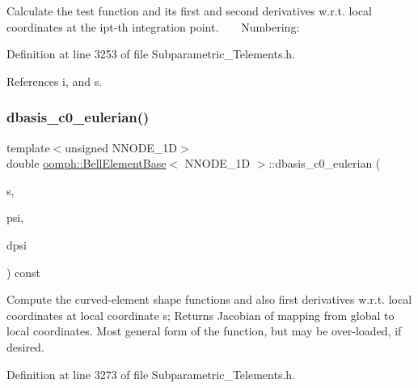 Calculate the test function and its first and second derivatives w.\+r.\+t. local coordinates at the ipt-\/th integration point. ~\newline
~\newline
 Numbering\+: 

Definition at line 3253 of file Subparametric\+\_\+\+Telements.\+h.



References i, and s.

\mbox{\label{classoomph_1_1BellElementBase_a27559cf4dd3cb50a84dfe40378c9c453}} 
\subsubsection{\texorpdfstring{dbasis\+\_\+c0\+\_\+eulerian()}{dbasis\_c0\_eulerian()}}
{\footnotesize\ttfamily template$<$unsigned N\+N\+O\+D\+E\+\_\+1D$>$ \\
double \hyperlink{classoomph_1_1BellElementBase}{oomph\+::\+Bell\+Element\+Base}$<$ N\+N\+O\+D\+E\+\_\+1D $>$\+::dbasis\+\_\+c0\+\_\+eulerian (\begin{DoxyParamCaption}\item[{const \hyperlink{classoomph_1_1Vector}{Vector}$<$ double $>$ \&}]{s,  }\item[{\hyperlink{classoomph_1_1Shape}{Shape} \&}]{psi,  }\item[{\hyperlink{classoomph_1_1DShape}{D\+Shape} \&}]{dpsi }\end{DoxyParamCaption}) const\hspace{0.3cm}{\ttfamily [inline]}}



Compute the curved-\/element shape functions and also first derivatives w.\+r.\+t. local coordinates at local coordinate s; Returns Jacobian of mapping from global to local coordinates. Most general form of the function, but may be over-\/loaded, if desired. 



Definition at line 3273 of file Subparametric\+\_\+\+Telements.\+h.

\mbox{\label{classoomph_1_1BellElementBase_ae863013db88be8402457a77eb5d5862f}} 

